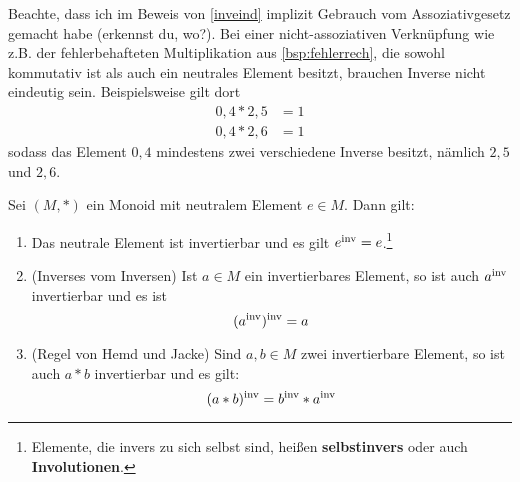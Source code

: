 \begin{bem}[*]
    Beachte, dass ich im Beweis von \cref{inveind} implizit Gebrauch vom Assoziativgesetz gemacht habe (erkennst du, wo?). Bei einer nicht-assoziativen Verknüpfung wie z.B. der fehlerbehafteten Multiplikation aus \cref{bsp:fehlerrech}, die sowohl kommutativ ist als auch ein neutrales Element besitzt, brauchen Inverse nicht eindeutig sein. Beispielsweise gilt dort
    \begin{align*}
        0{,}4 * 2{,}5 & = 1 \\
        0{,}4 * 2{,}6 & = 1
    \end{align*}
    sodass das Element $0{,}4$ mindestens zwei verschiedene Inverse besitzt, nämlich $2{,}5$ und $2{,}6$.
\end{bem}


\begin{satz} \label{regelnfuerinv} 
    Sei $(M,*)$ ein Monoid mit neutralem Element $e\in M$. Dann gilt:
    \begin{enumerate}
        \item Das neutrale Element ist invertierbar und es gilt $e^{\mathrm{inv}} = e$.\footnote{Elemente, die invers zu sich selbst sind, heißen \textbf{selbstinvers} oder auch \textbf{Involutionen}.}
        \item(Inverses vom Inversen) Ist $a\in M$ ein invertierbares Element, so ist auch $a^{\mathrm{inv}}$ invertierbar und es ist
            \[(a^{\mathrm{inv}})^{\mathrm{inv}} = a \]
        \item(Regel von Hemd und Jacke) Sind $a,b\in M$ zwei invertierbare Element, so ist auch $a*b$ invertierbar und es gilt:
            \[ (a*b)^{\mathrm{inv}} = b^{\mathrm{inv}} * a^{\mathrm{inv}} \]
    \end{enumerate}
\end{satz}



